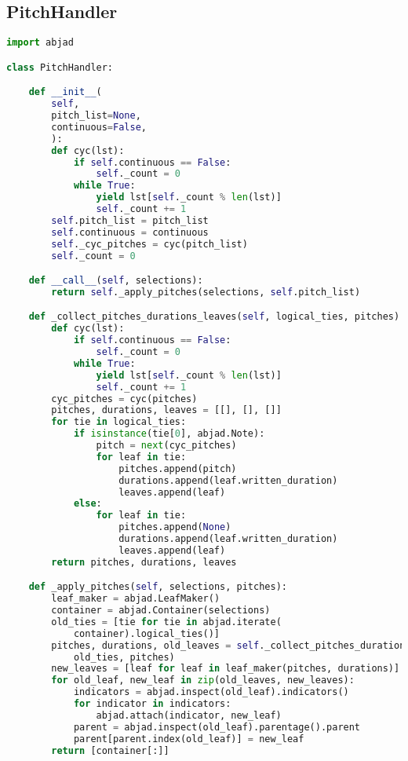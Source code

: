 \subsection{PitchHandler}
\singlespace
\begin{lstlisting}[language=Python, caption=PitchHandler]
import abjad

class PitchHandler:

    def __init__(
        self,
        pitch_list=None,
        continuous=False,
        ):
        def cyc(lst):
            if self.continuous == False:
                self._count = 0
            while True:
                yield lst[self._count % len(lst)]
                self._count += 1
        self.pitch_list = pitch_list
        self.continuous = continuous
        self._cyc_pitches = cyc(pitch_list)
        self._count = 0

    def __call__(self, selections):
        return self._apply_pitches(selections, self.pitch_list)

    def _collect_pitches_durations_leaves(self, logical_ties, pitches):
        def cyc(lst):
            if self.continuous == False:
                self._count = 0
            while True:
                yield lst[self._count % len(lst)]
                self._count += 1
        cyc_pitches = cyc(pitches)
        pitches, durations, leaves = [[], [], []]
        for tie in logical_ties:
            if isinstance(tie[0], abjad.Note):
                pitch = next(cyc_pitches)
                for leaf in tie:
                    pitches.append(pitch)
                    durations.append(leaf.written_duration)
                    leaves.append(leaf)
            else:
                for leaf in tie:
                    pitches.append(None)
                    durations.append(leaf.written_duration)
                    leaves.append(leaf)
        return pitches, durations, leaves

    def _apply_pitches(self, selections, pitches):
        leaf_maker = abjad.LeafMaker()
        container = abjad.Container(selections)
        old_ties = [tie for tie in abjad.iterate(
            container).logical_ties()]
        pitches, durations, old_leaves = self._collect_pitches_durations_leaves(
            old_ties, pitches)
        new_leaves = [leaf for leaf in leaf_maker(pitches, durations)]
        for old_leaf, new_leaf in zip(old_leaves, new_leaves):
            indicators = abjad.inspect(old_leaf).indicators()
            for indicator in indicators:
                abjad.attach(indicator, new_leaf)
            parent = abjad.inspect(old_leaf).parentage().parent
            parent[parent.index(old_leaf)] = new_leaf
        return [container[:]]
\end{lstlisting}
\doublespace

